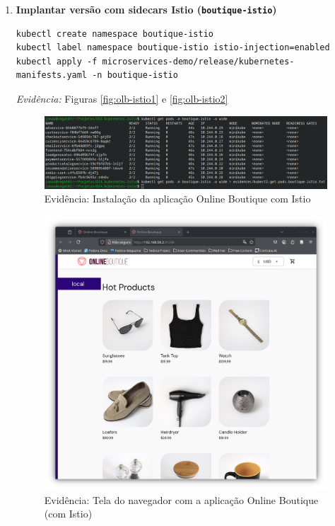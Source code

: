 \documentclass[12pt,a4paper]{report}
\begin{document}
\begin{enumerate}
\item\textbf{Implantar versão com sidecars Istio (\texttt{boutique-istio})}
\begin{lstlisting}[style=shell]
kubectl create namespace boutique-istio
kubectl label namespace boutique-istio istio-injection=enabled
kubectl apply -f microservices-demo/release/kubernetes-manifests.yaml -n boutique-istio
\end{lstlisting}
\textit{Evidência:} Figuras \ref{fig:olb-istio1} e \ref{fig:olb-istio2}\\

\begin{figure}[h]
    \centering
    \includegraphics[width=1\linewidth]{figures/evidence-olbistio2.png}
    \caption{Evidência: Instalação da aplicação Online Boutique com Istio}
    \label{fig:olb-base1}
\end{figure}

\begin{figure}[h]
    \centering
    \includegraphics[width=1\linewidth]{figures/evidence-olbistio3.png}
    \caption{Evidência: Tela do navegador com a aplicação Online Boutique (com Istio)}
    \label{fig:olb-base2}
\end{figure}
\end{enumerate}
\end{document}
